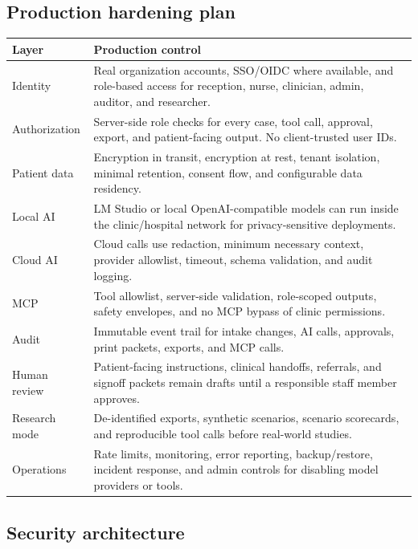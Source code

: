 \documentclass[11pt,letterpaper]{article}
\begin{document}
\subsection{Production hardening plan}

\begin{table}[H]
\centering
\begin{tabularx}{\linewidth}{@{}L{1.65in}Y@{}}
\toprule
\textbf{Layer} & \textbf{Production control} \\
\midrule
Identity & Real organization accounts, SSO/OIDC where available, and role-based access for reception, nurse, clinician, admin, auditor, and researcher. \\
Authorization & Server-side role checks for every case, tool call, approval, export, and patient-facing output. No client-trusted user IDs. \\
Patient data & Encryption in transit, encryption at rest, tenant isolation, minimal retention, consent flow, and configurable data residency. \\
Local AI & LM Studio or local OpenAI-compatible models can run inside the clinic/hospital network for privacy-sensitive deployments. \\
Cloud AI & Cloud calls use redaction, minimum necessary context, provider allowlist, timeout, schema validation, and audit logging. \\
MCP & Tool allowlist, server-side validation, role-scoped outputs, safety envelopes, and no MCP bypass of clinic permissions. \\
Audit & Immutable event trail for intake changes, AI calls, approvals, print packets, exports, and MCP calls. \\
Human review & Patient-facing instructions, clinical handoffs, referrals, and signoff packets remain drafts until a responsible staff member approves. \\
Research mode & De-identified exports, synthetic scenarios, scenario scorecards, and reproducible tool calls before real-world studies. \\
Operations & Rate limits, monitoring, error reporting, backup/restore, incident response, and admin controls for disabling model providers or tools. \\
\bottomrule
\end{tabularx}
\end{table}

\subsection{Security architecture}
\end{document}
